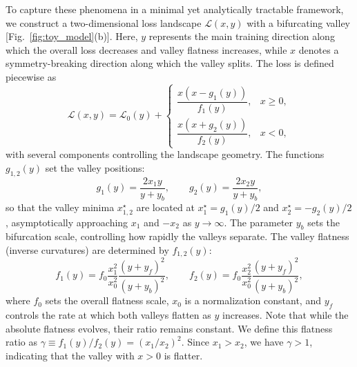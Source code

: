 \documentclass[aps,prx,reprint,superscriptaddress,longbibliography,nofootinbib,floatfix]{revtex4-2}
\begin{document}
To capture these phenomena in a minimal yet analytically tractable framework, we construct a two-dimensional loss landscape $\mathcal{L}(x, y)$ with a bifurcating valley [Fig.~\ref{fig:toy_model}(b)]. Here, $y$ represents the main training direction along which the overall loss decreases and valley flatness increases, while $x$ denotes a symmetry-breaking direction along which the valley splits. The loss is defined piecewise as
\begin{equation}
    \mathcal{L}(x, y) = \mathcal{L}_0(y)  +
    \begin{cases}
       \dfrac{x(x - g_1(y))}{f_1(y)}, & x \geq 0, \\
       \dfrac{x(x + g_2(y))}{f_2(y)}, & x < 0,
    \end{cases}
    \label{eq:loss_toy_model}
\end{equation}
with several components controlling the landscape geometry. The functions $g_{1,2}(y)$ set the valley positions:
\begin{equation}
    g_1(y) = \frac{2 x_1 y}{y + y_b}, \qquad 
    g_2(y) = \frac{2 x_2 y}{y + y_b},
\end{equation}
so that the valley minima $x_{1,2}^{\star}$ are located at $x_1^{\star} = g_1(y)/2$ and $x_2^{\star} = -g_2(y)/2$, asymptotically approaching $x_1$ and $-x_2$ as $y \to \infty$. The parameter $y_b$ sets the bifurcation scale, controlling how rapidly the valleys separate. The valley flatness (inverse curvatures) are determined by $f_{1,2}(y)$:
\begin{equation}
    f_1(y) = f_0 \frac{x_1^2}{x_0^2} \frac{(y+y_f)^2}{(y+y_b)^2}, 
    \qquad 
    f_2(y) = f_0 \frac{x_2^2}{x_0^2} \frac{(y+y_f)^2}{(y+y_b)^2},
\end{equation}
where $f_0$ sets the overall flatness scale, $x_0$ is a normalization constant, and $y_f$ controls the rate at which both valleys flatten as $y$ increases. Note that while the absolute flatness evolves, their ratio remains constant. We define this flatness ratio as $\gamma \equiv f_1(y)/f_2(y) = (x_1/x_2)^2$. Since $x_1 > x_2$, we have $\gamma > 1$, indicating that the valley with $x>0$ is flatter.
\end{document}
